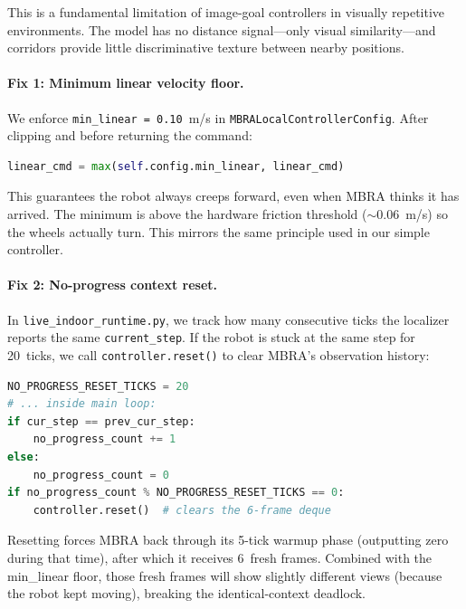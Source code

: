\documentclass[11pt,a4paper]{article}
\begin{document}
This is a fundamental limitation of image-goal controllers in visually
repetitive environments.  The model has no distance signal---only visual
similarity---and corridors provide little discriminative texture between
nearby positions.

\paragraph{Fix 1: Minimum linear velocity floor.}
We enforce \texttt{min\_linear = 0.10}~m/s in \texttt{MBRALocalControllerConfig}.
After clipping and before returning the command:

\begin{lstlisting}[language=Python]
linear_cmd = max(self.config.min_linear, linear_cmd)
\end{lstlisting}

This guarantees the robot always creeps forward, even when MBRA thinks it has
arrived.  The minimum is above the hardware friction threshold ($\sim$0.06~m/s)
so the wheels actually turn.  This mirrors the same principle used in our
simple controller.

\paragraph{Fix 2: No-progress context reset.}
In \texttt{live\_indoor\_runtime.py}, we track how many consecutive ticks the
localizer reports the same \texttt{current\_step}.  If the robot is stuck at
the same step for 20~ticks, we call \texttt{controller.reset()} to clear
MBRA's observation history:

\begin{lstlisting}[language=Python]
NO_PROGRESS_RESET_TICKS = 20
# ... inside main loop:
if cur_step == prev_cur_step:
    no_progress_count += 1
else:
    no_progress_count = 0
if no_progress_count % NO_PROGRESS_RESET_TICKS == 0:
    controller.reset()  # clears the 6-frame deque
\end{lstlisting}

Resetting forces MBRA back through its 5-tick warmup phase (outputting zero
during that time), after which it receives 6~fresh frames.  Combined with the
min\_linear floor, those fresh frames will show slightly different views
(because the robot kept moving), breaking the identical-context deadlock.
\end{document}
